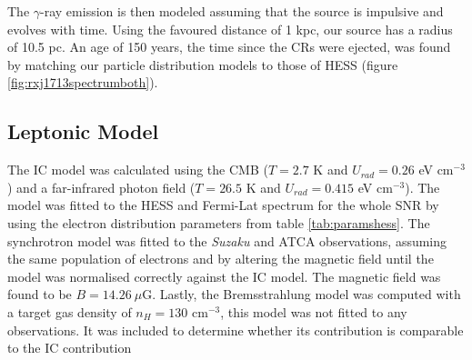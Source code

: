 \documentclass[12pt,a4paper]{article}
\begin{document}
The $\gamma$-ray emission is then modeled assuming that the source is impulsive and evolves with time. Using the favoured distance of 1 kpc, our source has a radius of 10.5 pc. An age of 150 years, the time since the CRs were ejected, was found by matching our particle distribution models to those of HESS (figure \ref{fig:rxj1713spectrumboth}). 


\subsection{Leptonic Model}
The IC model was calculated using the CMB ($T = 2.7$ K and $U_{rad} = 0.26$ eV cm$^{-3}$) and a far-infrared photon field ($T = 26.5$ K and $U_{rad} = 0.415$ eV cm$^{-3}$). The model was fitted to the HESS and Fermi-Lat spectrum for the whole SNR by using the electron distribution parameters from table \ref{tab:paramshess}. The synchrotron model was fitted to the \textit{Suzaku} and ATCA observations, assuming the same population of electrons and by altering the magnetic field until the model was normalised correctly against the IC model. The magnetic field was found to be $B = 14.26 \ \mu$G. Lastly, the Bremsstrahlung model was computed with a target gas density of $n_H = 130$ cm$^{-3}$, this model was not fitted to any observations. It was included to determine whether its contribution is comparable to the IC contribution\\
\end{document}
